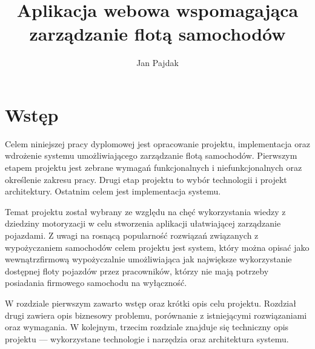 \documentclass[eng,printmode,openany]{mgr}
\title{Aplikacja webowa wspomagająca zarządzanie flotą samochodów}
\author{Jan Pajdak}
\begin{document}


\maketitle

\tableofcontents 


\chapter{Wstęp}
Celem niniejszej pracy dyplomowej jest opracowanie projektu, implementacja oraz wdrożenie systemu umożliwiającego zarządzanie flotą samochodów. Pierwszym etapem projektu jest zebrane wymagań funkcjonalnych i niefunkcjonalnych oraz określenie zakresu pracy. Drugi etap projektu to wybór technologii i projekt architektury. Ostatnim celem jest implementacja systemu.

Temat projektu został wybrany ze względu na chęć wykorzystania wiedzy z dziedziny motoryzacji w celu stworzenia aplikacji ułatwiającej zarządzanie pojazdami. Z uwagi na rosnącą popularność rozwiązań związanych z wypożyczaniem samochodów celem projektu jest system, który można opisać jako wewnątrzfirmową wypożyczalnie umożliwiająca jak największe wykorzystanie dostępnej floty pojazdów przez pracowników, którzy nie mają potrzeby posiadania firmowego samochodu na wyłączność. 

W rozdziale pierwszym zawarto wstęp oraz krótki opis celu projektu. Rozdział drugi zawiera opis biznesowy problemu, porównanie z istniejącymi rozwiązaniami oraz wymagania. W kolejnym, trzecim rozdziale znajduje się techniczny opis projektu — wykorzystane technologie i narzędzia oraz architektura systemu.

\end{document}
